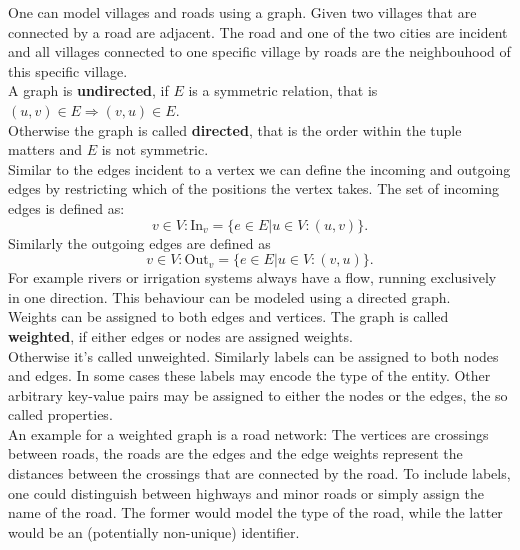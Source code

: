             One can model villages and roads using a graph. 
            Given two villages that are connected by a road are adjacent. 
            The road and one of the two cities are incident and all villages connected to one specific village by roads are the neighbouhood of this specific village. \\
            
            A graph is \textbf{undirected}, if $E$ is a symmetric relation, that is $(u, v) \in E \Rightarrow (v, u) \in E$. \\
            Otherwise the graph is called \textbf{directed}, that is the order within the tuple matters and $E$ is not symmetric. \\
            
            Similar to the edges incident to a vertex we can define the incoming and outgoing edges by restricting which of the positions the vertex takes. 
            The set of incoming edges is defined as:
            \[v \in V: \text{In}_v = \{e \in E |u \in V: (u, v) \}.\]
            Similarly the outgoing edges are defined as \[v \in V: \text{Out}_v = \{e \in E |u \in V: (v, u) \}.\]
            For example rivers or irrigation systems always have a flow, running exclusively in one direction. 
            This behaviour can be modeled using a directed graph.\\
            
            Weights can be assigned to both edges and vertices. The graph is called \textbf{weighted}, if either edges or nodes are assigned weights. \\
            Otherwise it's called unweighted.
            Similarly labels can be assigned to both nodes and edges. 
            In some cases these labels may encode the type of the entity.
            Other arbitrary key-value pairs may be assigned to either the nodes or the edges, the so called properties. \\
            
            An example for a weighted graph is a road network: 
            The vertices are crossings between roads, the roads are the edges and the edge weights represent the distances between the crossings that are connected by the road.
            To include labels, one could distinguish between highways and minor roads or simply assign the name of the road. 
            The former would model the type of the road, while the latter would be an (potentially non-unique) identifier.\\
            

